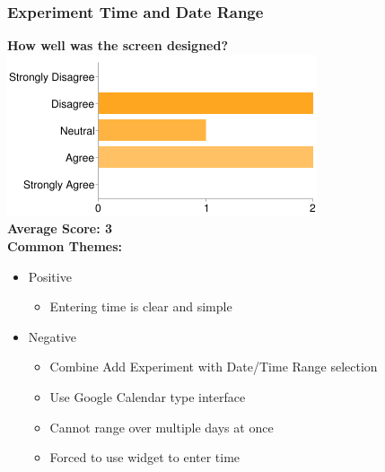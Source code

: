 \subsubsection{Experiment Time and Date Range}
\textbf{How well was the screen designed?}\\
\includegraphics[page=1,scale=0.65]{../other/usability-report-charts/select_experiment_date_time_bar_chart}\\
\textbf{Average Score: 3}\\
\textbf{Common Themes:}
\begin{itemize}
\item Positive
\begin{itemize}
\item Entering time is clear and simple
\end{itemize}
\item Negative
\begin{itemize}
\item Combine Add Experiment with Date/Time Range selection
\item Use Google Calendar type interface
\item Cannot range over multiple days at once
\item Forced to use widget to enter time
\end{itemize}
\end{itemize}

